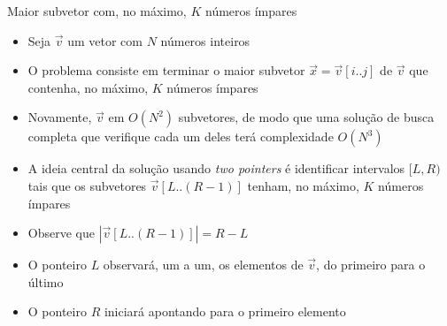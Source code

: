 \begin{frame}[fragile]{Maior subvetor com, no máximo, $K$ números ímpares}

    \begin{itemize}
        \item Seja $\vec{v}$ um vetor com $N$ números inteiros

        \item O problema consiste em terminar o maior subvetor $\vec{x} = \vec{v}[i..j]$ de 
            $\vec{v}$ que contenha, no máximo, $K$ números ímpares

        \item Novamente, $\vec{v}$ em $O(N^2)$ subvetores, de modo que uma solução de busca
            completa que verifique cada um deles terá complexidade $O(N^3)$

        \item A ideia central da solução usando \textit{two pointers} é identificar intervalos
            $[L, R)$ tais que os subvetores $\vec{v}[L..(R - 1)]$ tenham, no máximo, $K$ números
            ímpares

        \item Observe que $|\vec{v}[L..(R-1)]| = R - L$
 
        \item O ponteiro $L$ observará, um a um, os elementos de $\vec{v}$, do primeiro para o 
            último

        \item O ponteiro $R$ iniciará apontando para o primeiro elemento
    \end{itemize}

\end{frame}

